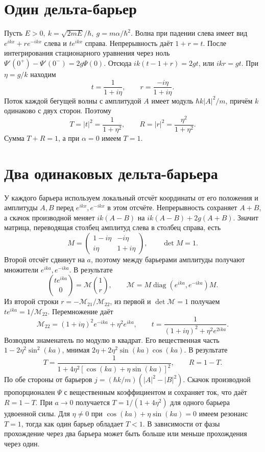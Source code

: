 \documentclass[11pt,a4paper]{article}
\begin{document}

\section{Один дельта-барьер}

Пусть \(E>0,\ k=\sqrt{2mE}/\hbar,\ g=m\alpha/\hbar^2\).
Волна при падении слева имеет вид \(e^{ikx}+r e^{-ikx}\)
слева и \(t e^{ikx}\) справа. Непрерывность даёт \(1+r=t\).
После интегрирования стационарного уравнения через ноль
\(\Psi'(0^+)-\Psi'(0^-)=2g\Psi(0)\). Отсюда
\(ik(t-1+r)=2g t\), или \(ik r=g t\).
При \(\eta=g/k\) находим
\[
 t=\frac1{1+i\eta},\qquad r=\frac{-i\eta}{1+i\eta}.
\]
Поток каждой бегущей волны с амплитудой \(A\) имеет модуль
\(\hbar k|A|^2/m\), причём \(k\) одинаково с двух сторон.
Поэтому
\[
 T=|t|^2=\frac1{1+\eta^2},\qquad R=|r|^2=\frac{\eta^2}{1+\eta^2}.
\]
Сумма \(T+R=1\), а при \(\alpha=0\) имеем \(T=1\).

\section{Два одинаковых дельта-барьера}

У каждого барьера используем локальный отсчёт координаты
от его положения и амплитуды \(A,B\) перед \(e^{ikx},e^{-ikx}\)
в этом отсчёте. Непрерывность сохраняет \(A+B\), а скачок
производной меняет \(ik(A-B)\) на \(ik(A-B)+2g(A+B)\).
Значит матрица, переводящая столбец амплитуд слева в столбец
справа, есть
\[
 M=\begin{pmatrix}1-i\eta&-i\eta\\ i\eta&1+i\eta\end{pmatrix},
 \qquad \det M=1.
\]
Второй отсчёт сдвинут на \(a\), поэтому между барьерами амплитуды
получают множители \(e^{ika},e^{-ika}\). В результате
\[
 \binom{t e^{ika}}0=\mathcal M\binom1r,\qquad
 \mathcal M=M\operatorname{diag}(e^{ika},e^{-ika})M .
\]
Из второй строки \(r=-\mathcal M_{21}/\mathcal M_{22}\), из
первой и \(\det\mathcal M=1\) получаем \(t e^{ika}=1/\mathcal M_{22}\).
Перемножение даёт
\[
 \mathcal M_{22}=(1+i\eta)^2 e^{-ika}+\eta^2 e^{ika},
 \qquad t=\frac1{(1+i\eta)^2+\eta^2 e^{2ika}}.
\]
Возводим знаменатель по модулю в квадрат. Его вещественная часть
\(1-2\eta^2\sin^2(ka)\), мнимая \(2\eta+2\eta^2\sin(ka)\cos(ka)\).
В результате
\[
 T=\frac1{1+4\eta^2[\cos(ka)+\eta\sin(ka)]^2},\qquad R=1-T .
\]
По обе стороны от барьеров \(j=(\hbar k/m)(|A|^2-|B|^2)\).
Скачок производной пропорционален \(\Psi\) с вещественным
коэффициентом и сохраняет ток, что даёт \(R=1-T\).
При \(a\to0\) получается
\(T=1/(1+4\eta^2)\) для одного барьера удвоенной силы.
Для \(\eta\ne0\) при \(\cos(ka)+\eta\sin(ka)=0\) имеем резонанс
\(T=1\), тогда как один барьер обладает \(T<1\). В зависимости
от фазы прохождение через два барьера может быть больше
или меньше прохождения через один.
\end{document}
